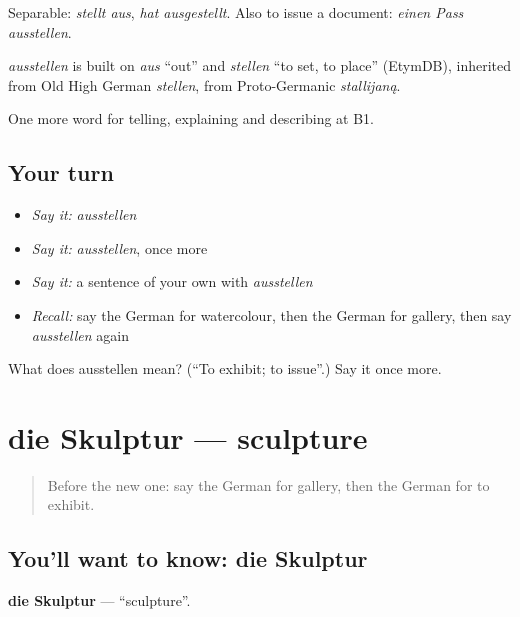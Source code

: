 Separable: \emph{stellt aus}, \emph{hat ausgestellt}. Also to issue a document: \emph{einen Pass ausstellen}.

\begin{cousinweb}
\emph{ausstellen} is built on \emph{aus} \textquotedblleft{}out\textquotedblright{} and \emph{stellen} \textquotedblleft{}to set, to place\textquotedblright{} (EtymDB), inherited from Old High German \emph{stellen}, from Proto-Germanic \emph{stallijaną}.
\end{cousinweb}

\begin{grammarlens}[title={What you've built}]
One more word for telling, explaining and describing at B1.
\end{grammarlens}

\subsection*{Your turn}
\begin{itemize}
\raggedright
  \item \emph{Say it:} \emph{ausstellen}
  \item \emph{Say it:} \emph{ausstellen}, once more
  \item \emph{Say it:} a sentence of your own with \emph{ausstellen}
  \item \emph{Recall:} say the German for watercolour, then the German for gallery, then say \emph{ausstellen} again
\end{itemize}

\begin{tcolorbox}[breakable,colback=teal!4,colframe=teal!35!black,title={Before you move on}]
What does ausstellen mean? (\textquotedblleft{}To exhibit; to issue\textquotedblright{}.) Say it once more.
\end{tcolorbox}
\section[die Skulptur]{die Skulptur — sculpture}

\label{lesson:GE-C519-skulptur}



\begin{quote}
Before the new one: say the German for gallery, then the German for to exhibit.
\end{quote}

\subsection*{You'll want to know: die Skulptur}
\textbf{die Skulptur} — \textquotedblleft{}sculpture\textquotedblright{}.

